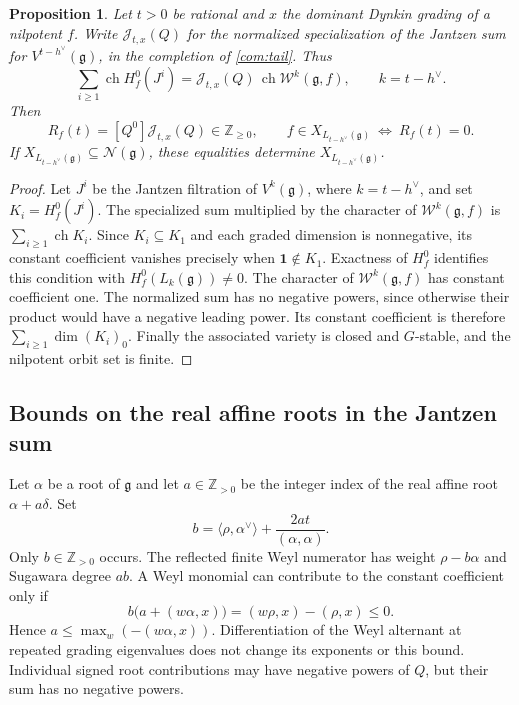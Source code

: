 \documentclass[11pt,a4paper]{amsart}
\numberwithin{equation}{section}
\newtheorem{proposition}[theorem]{Proposition}
\theoremstyle{definition}
\theoremstyle{remark}
\newcommand{\Z}{\mathbb Z}
\newcommand{\g}{\mathfrak g}
\newcommand{\N}{\mathcal N}
\newcommand{\ch}{\operatorname{ch}}
\begin{document}
\begin{proposition}\label{prop:orbit-vacuum}
Let $t>0$ be rational and $x$ the dominant Dynkin grading of a nilpotent
$f$. Write $\mathcal J_{t,x}(Q)$ for the normalized specialization of the
Jantzen sum for $V^{t-h^\vee}(\g)$, in the completion of
\cref{com:tail}. Thus
$$
 \sum_{i\ge1}\ch H_f^0(J^i)
 =\mathcal J_{t,x}(Q)\,\ch\mathcal W^k(\g,f),
 \qquad k=t-h^\vee.
$$
Then
$$
 R_f(t)=[Q^0]\mathcal J_{t,x}(Q)\in\Z_{\ge0},\qquad
 f\in X_{L_{t-h^\vee}(\g)}\ \Longleftrightarrow\ R_f(t)=0.
$$
If $X_{L_{t-h^\vee}(\g)}\subseteq\N(\g)$, these equalities
determine $X_{L_{t-h^\vee}(\g)}$.
\end{proposition}
\begin{proof}
Let $J^i$ be the Jantzen filtration of $V^k(\g)$, where
$k=t-h^\vee$, and set $K_i=H_f^0(J^i)$. The specialized sum
multiplied by the character of $\mathcal W^k(\g,f)$ is
$\sum_{i\ge1}\operatorname{ch}K_i$. Since $K_i\subseteq K_1$
and each graded dimension is nonnegative, its constant coefficient
vanishes precisely when $\mathbf1\notin K_1$.
Exactness of $H_f^0$ identifies this condition with
$H_f^0(L_k(\g))\ne0$. The character of
$\mathcal W^k(\g,f)$ has constant coefficient one.
The normalized sum has no negative powers, since otherwise their product
would have a negative leading power. Its constant coefficient is therefore
$\sum_{i\ge1}\dim(K_i)_0$. Finally the associated variety is closed and
$G$-stable, and the nilpotent orbit set is finite.
\end{proof}

\subsection{Bounds on the real affine roots in the Jantzen sum}
Let $\alpha$ be a root of $\g$ and let $a\in\Z_{>0}$ be the
integer index of the real affine root $\alpha+a\delta$. Set
$$
 b=\langle\rho,\alpha^\vee\rangle+
       \frac{2at}{(\alpha,\alpha)}.
$$
Only $b\in\Z_{>0}$ occurs. The reflected finite Weyl numerator has
weight $\rho-b\alpha$ and Sugawara degree $ab$. A Weyl monomial can
contribute to the constant coefficient only if
\begin{equation}\label{eq:orbit-cutoff}
 b\bigl(a+(w\alpha,x)\bigr)=(w\rho,x)-(\rho,x)\le0.
\end{equation}
Hence $a\le\max_w(-(w\alpha,x))$. Differentiation of the Weyl
alternant at repeated grading eigenvalues does not change its exponents or
this bound. Individual signed root contributions may have
negative powers of $Q$, but their sum has no negative powers.
\end{document}
